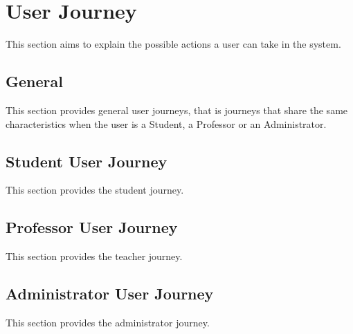 \section{User Journey}
This section aims to explain the possible actions a user can take in the system. 

\subsection{General}
This section provides general user journeys, that is journeys that share the same 
characteristics when the user is a Student, a Professor or an Administrator.
% 


% 

\subsection{Student User Journey}
This section provides the student journey.




\subsection{Professor User Journey}
This section provides the teacher journey.





\subsection{Administrator User Journey}
This section provides the administrator journey.



